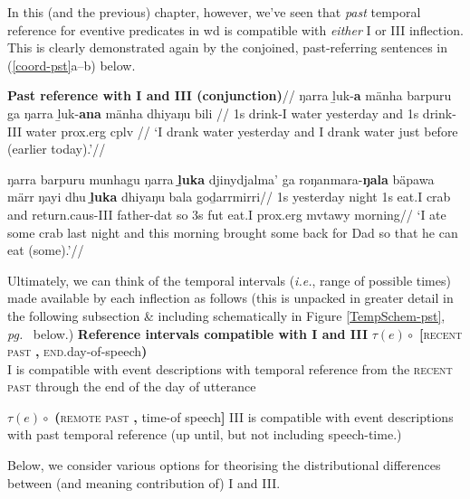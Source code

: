In this (and the previous) chapter, however, we've seen that \textit{past} temporal reference for eventive predicates in \gls{wd} is compatible with \textit{either} \gls{I} or \gls{III} inflection. This is clearly demonstrated again by the conjoined, past-referring sentences in (\ref{coord-pst}a--b) below.

\pex\glpreamble \textbf{Past reference with \gls{I} and \gls{III} (conjunction)}\label{coord-pst}//
\a\begingl\gla \nogloss{[} ŋarra ḻuk-\textbf{a} mänha barpuru \nogloss{]} ga \nogloss{[} ŋarra ḻuk-\textbf{ana} mänha dhiyaŋu bili \nogloss{]}//
\glb 1s drink-\gls{I} water yesterday and 1s drink-\gls{III} water \gls{prox}.\gls{erg} \gls{cplv} //
\glft`I drank water yesterday and I drank water just before (earlier today).'\trailingcitation{[DB~20190405]}//\endgl


\a\begingl\gla ŋarra barpuru munhagu ŋarra \textbf{ḻuka} djinydjalma' ga roŋanmara-\textbf{ŋala} bäpawa märr ŋayi dhu \textbf{ḻuka} dhiyaŋu bala goḏarrmirri//
\glb 1s yesterday night 1s eat.\gls{I} crab and return.\gls{caus}-\gls{III} father-\gls{dat} so 3s \gls{fut} eat.\gls{I} \gls{prox}.\gls{erg} \gls{mvtawy} morning//
\glft`I ate some crab last night and this morning brought some back for Dad so that he can eat (some).'\trailingcitation{[DB~20190416]}//\endgl

\xe



Ultimately, we can think of the temporal intervals (\textit{i.e.}, range of possible times) made available by each inflection as follows (this is unpacked in greater detail in the following subsection \& including schematically in Figure \ref{TempSchem-pst}, \textit{pg.}~\pageref{TempSchem-pst} below.) 
\pex[labelformat=A] \textbf{Reference intervals compatible with \gls{I} and \gls{III}}
	\a[label=\textbf{\phantom{I}\gls{I}\phantom{I}}]$ \tau(e) \circ$ \textbf{[}\textsc{recent past} \textbf{,} \textsc{end}.day-of-speech\textbf{)}\\
	\gls{I} is compatible with event descriptions with temporal reference from the \textsc{recent past} through the end of the day of utterance
	
	\a[label=\gls{III}]$ \tau(e) \circ$ \textbf{(}\textsc{remote past} \textbf{,} time-of speech\textbf{]} 
	\gls{III} is compatible with event descriptions with past temporal reference (up until, but not including speech-time.)
	
\xe

Below, we consider various options for theorising the distributional differences between (and meaning contribution of) \gls{I} and \gls{III}.

